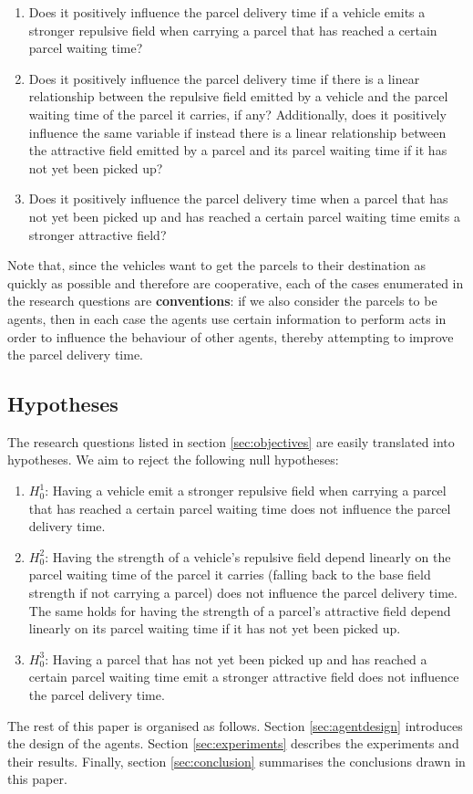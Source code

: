 \begin{enumerate}
\item Does it positively influence the parcel delivery time if a vehicle emits a stronger repulsive field when carrying a parcel that has reached a certain parcel waiting time?
\item Does it positively influence the parcel delivery time if there is a linear relationship between the repulsive field emitted by a vehicle and the parcel waiting time of the parcel it carries, if any? Additionally, does it positively influence the same variable if instead there is a linear relationship between the attractive field emitted by a parcel and its parcel waiting time if it has not yet been picked up?
\item Does it positively influence the parcel delivery time when a parcel that has not yet been picked up and has reached a certain parcel waiting time emits a stronger attractive field?
\end{enumerate}

Note that, since the vehicles want to get the parcels to their destination as quickly as possible and therefore are cooperative, each of the cases enumerated in the research questions are \textbf{conventions}: if we also consider the parcels to be agents, then in each case the agents use certain information to perform acts in order to influence the behaviour of other agents, thereby attempting to improve the parcel delivery time.

\subsection{Hypotheses}\label{sec:hypotheses}
The research questions listed in section \ref{sec:objectives} are easily translated into hypotheses. We aim to reject the following null hypotheses:
\begin{enumerate}
\item $H^1_0$: Having a vehicle emit a stronger repulsive field when carrying a parcel that has reached a certain parcel waiting time does not influence the parcel delivery time.
\item $H^2_0$: Having the strength of a vehicle's repulsive field depend linearly on the parcel waiting time of the parcel it carries (falling back to the base field strength if not carrying a parcel) does not influence the parcel delivery time. The same holds for having the strength of a parcel's attractive field depend linearly on its parcel waiting time if it has not yet been picked up.
\item $H^3_0$: Having a parcel that has not yet been picked up and has reached a certain parcel waiting time emit a stronger attractive field does not influence the parcel delivery time.
\end{enumerate}

The rest of this paper is organised as follows. Section \ref{sec:agentdesign} introduces the design of the agents. Section \ref{sec:experiments} describes the experiments and their results. Finally, section \ref{sec:conclusion} summarises the conclusions drawn in this paper.